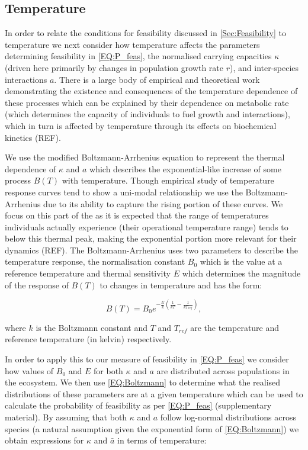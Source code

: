 \documentclass{article}
\begin{document}
\subsection{Temperature} \label{SEC:Temperature}
In order to relate the conditions for feasibility discussed in \cref{Sec:Feasibility} to temperature we next consider how temperature affects the parameters determining feasibility in \cref{EQ:P_feas}, the normalised carrying capacities $\kappa$ (driven here primarily by changes in population growth rate $r$), and inter-species interactions $a$. There is a large body of empirical and theoretical work demonstrating the existence and consequences of the temperature dependence of these processes which can be explained by their dependence on metabolic rate (which determines the capacity of individuals to fuel growth and interactions), which in turn is affected by temperature through its effects on biochemical kinetics (REF).

We use the modified Boltzmann-Arrhenius equation to represent the thermal dependence of $\kappa$ and $a$ which describes the exponential-like increase of some process $B(T)$ with temperature. Though empirical study of temperature response curves tend to show a uni-modal relationship we use the Boltzmann-Arrhenius due to its ability to capture the rising portion of these curves. We focus on this part of the  as it is expected that the range of temperatures individuals actually experience (their operational temperature range) tends to below this thermal peak, making the exponential portion more relevant for their dynamics (REF). The Boltzmann-Arrhenius uses two parameters to describe the temperature response, the normalisation constant $B_0$ which is the value at a reference temperature and thermal sensitivity $E$ which determines the magnitude of the response of $B(T)$ to changes in temperature and has the form:

\begin{equation} \label{EQ:Boltzmann}
    B(T) = B_0 e^{-\frac{E}{k} \left(\frac{1}{kT} - \frac{1}{k T_{ref} }\right)},
\end{equation}

where $k$ is the Boltzmann constant and $T$ and $T_{ref}$ are the temperature and reference temperature (in kelvin) respectively. 

In order to apply this to our measure of feasibility in \cref{EQ:P_feas} we consider how values of $B_0$ and $E$ for both $\kappa$ and $a$ are distributed across populations in the ecosystem. We then use \cref{EQ:Boltzmann} to determine what the realised distributions of these parameters are at a given temperature which can be used to calculate the probability of feasibility as per \cref{EQ:P_feas} (supplementary material). By assuming that both $\kappa$ and $a$ follow log-normal distributions across species (a natural assumption given the exponential form of \cref{EQ:Boltzmann}) we obtain expressions for $\kappa$ and $\bar{a}$ in terms of temperature:
\end{document}
